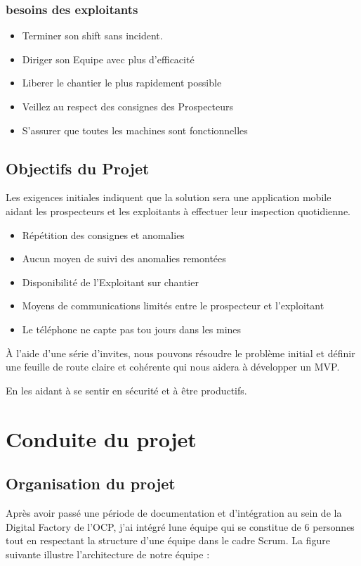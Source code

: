 \subsubsection{besoins des exploitants}
\begin{itemize}
\item Terminer son shift sans incident.
\item Diriger son Equipe avec plus d'efficacit\'e
\item Liberer le chantier le plus rapidement possible
\item Veillez au respect des consignes des Prospecteurs
\item S'assurer que toutes les machines sont fonctionnelles
\end{itemize}

\subsection{Objectifs du Projet}

Les exigences initiales indiquent que la solution sera une application mobile aidant les prospecteurs et les exploitants \`a effectuer leur inspection quotidienne.

\begin{itemize}
\item R\'ep\'etition des consignes et anomalies
\item Aucun moyen de suivi des anomalies remont\'ees 
\item Disponibilit\'e de l'Exploitant sur chantier
\item Moyens de communications limit\'es entre le prospecteur et l'exploitant
\item Le t\'el\'ephone ne capte pas tou jours dans les mines 
\end{itemize}

\`A l'aide d'une s\'erie d'invites, nous pouvons r\'esoudre le probl\`eme initial et d\'efinir une feuille de route claire et coh\'erente qui nous aidera \`a d\'evelopper un MVP.

En les aidant \`a se sentir en s\'ecurit\'e et \`a \^etre productifs.

\section{Conduite du projet}
\subsection{Organisation du projet}
Apr\`es avoir pass\'e une p\'eriode de documentation et d'int\'egration au sein de la Digital Factory de l'OCP, j'ai int\'egr\'e lune \'equipe qui se constitue de 6 personnes tout en respectant la structure d'une \'equipe dans le cadre Scrum.
La figure suivante illustre l'architecture de notre \'equipe :

